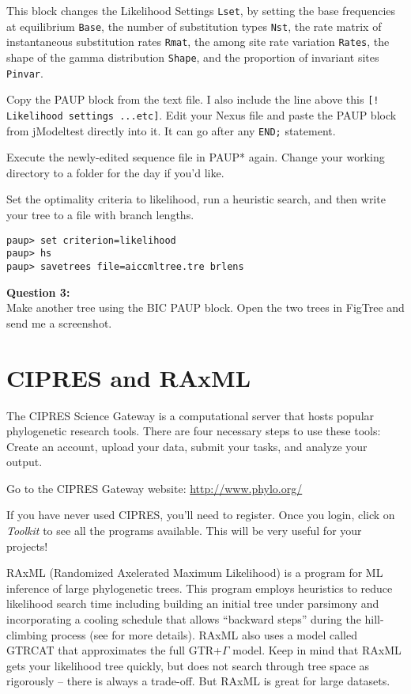 \documentclass[11pt]{article}
\begin{document}
This block changes the Likelihood Settings \texttt{Lset}, 
by setting the base frequencies at equilibrium \texttt{Base}, 
the number of substitution types \texttt{Nst}, 
the rate matrix of instantaneous substitution rates \texttt{Rmat}, 
the among site rate variation \texttt{Rates}, 
the shape of the gamma distribution \texttt{Shape}, 
and the proportion of invariant sites \texttt{Pinvar}.


Copy the PAUP block from the text file.  I also include the line above this \texttt{[! Likelihood settings ...etc]}. 
Edit your Nexus file and paste the PAUP block from jModeltest directly into it. 
It can go after any \texttt{END;} statement.  

Execute the newly-edited sequence file in PAUP* again.  Change your working directory to a folder for the day if you'd like.

Set the optimality criteria to likelihood, run a heuristic search, and then write your tree to a file with branch lengths.

\begin{verbatim}
paup> set criterion=likelihood
paup> hs
paup> savetrees file=aiccmltree.tre brlens
\end{verbatim}

\begin{framed}
\noindent
\textbf{Question 3:} \\
Make another tree using the BIC PAUP block. Open the two trees in FigTree and send me a screenshot. 
\end{framed}


\section{CIPRES and RAxML}

The CIPRES Science Gateway is a computational server that hosts popular phylogenetic research tools.  There are four necessary steps to use these tools:  Create an account, upload your data, submit your tasks, and analyze your output. 

Go to the CIPRES Gateway website: \url{http://www.phylo.org/}

If you have never used CIPRES, you'll need to register.
Once you login, click on \textit{Toolkit} to see all the programs available.
This will be very useful for your projects!

RAxML (Randomized Axelerated Maximum Likelihood) is a program for ML inference of large phylogenetic trees.  
This program employs heuristics to reduce likelihood search time including building an initial tree 
under parsimony and incorporating a cooling schedule that allows ``backward steps'' 
during the hill-climbing process (see \citet{stamatakis2005raxml} for more details).  
RAxML also uses a model called GTRCAT that approximates the full GTR+$\Gamma$ model.
Keep in mind that RAxML gets your likelihood tree quickly, 
but does not search through tree space as rigorously -- there is always a trade-off.
But RAxML is great for large datasets.
\end{document}
